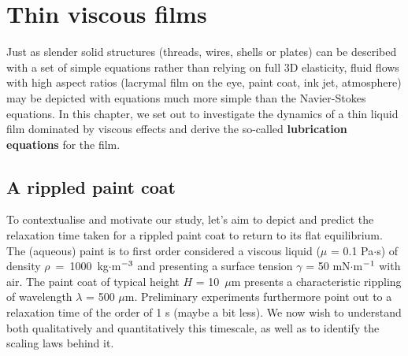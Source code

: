\chapter[Thin viscous films]{{\bfseries Thin} viscous {\bfseries films}}
\label{chap:thin_viscous_films}

Just as slender solid structures (threads, wires, shells or plates) can be described with a set of simple equations rather than relying on full 3D elasticity, fluid flows with high aspect ratios (lacrymal film on the eye, paint coat, ink jet, atmosphere) may be depicted with equations much more simple than the Navier-Stokes equations. In this chapter, we set out to investigate the dynamics of a thin liquid film dominated by viscous effects and derive the so-called \textbf{lubrication equations} for the film.
\section{A rippled paint coat}
To contextualise and motivate our study, let's aim to depict and predict the relaxation time taken for a rippled paint coat to return to its flat equilibrium. The (aqueous) paint is to first order considered a viscous liquid ($\mu$ = 0.1 Pa$\cdot$s) of density $\rho$~=~1000~kg$\cdot$m$^{-\text 3}$ and presenting a surface tension $\gamma$ = 50 mN$\cdot$m$^{-\text 1}$ with air.
The paint coat of typical height $H$ = 10~$\mu$m presents a characteristic rippling of wavelength $\lambda$ = 500 $\mu$m.
Preliminary experiments furthermore point out to a relaxation time of the order of 1 s (maybe a bit less). We now wish to understand both qualitatively and quantitatively this timescale, as well as to identify the scaling laws behind it.
